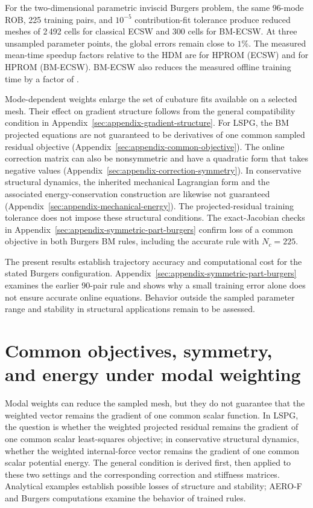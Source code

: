 \documentclass[a4paper,12pt]{article}
\begin{document}
For the two-dimensional parametric inviscid Burgers problem, the same 96-mode ROB, 225 training pairs, and $10^{-5}$ contribution-fit tolerance produce reduced meshes of 2\,492 cells for classical ECSW and 300 cells for BM-ECSW. At three unsampled parameter points, the global errors remain close to $1\%$. The measured mean-time speedup factors relative to the HDM are \ECSWFOMSpeedup{} for HPROM (ECSW) and \BMFOMSpeedup{} for HPROM (BM-ECSW). BM-ECSW also reduces the measured offline training time by a factor of \OfflineTrainingRatio{}.

Mode-dependent weights enlarge the set of cubature fits available on a selected mesh. Their effect on gradient structure follows from the general compatibility condition in Appendix~\ref{sec:appendix-gradient-structure}. For LSPG, the BM projected equations are not guaranteed to be derivatives of one common sampled residual objective (Appendix~\ref{sec:appendix-common-objective}). The online correction matrix can also be nonsymmetric and have a quadratic form that takes negative values (Appendix~\ref{sec:appendix-correction-symmetry}). In conservative structural dynamics, the inherited mechanical Lagrangian form and the associated energy-conservation construction are likewise not guaranteed (Appendix~\ref{sec:appendix-mechanical-energy}). The projected-residual training tolerance does not impose these structural conditions. The exact-Jacobian checks in Appendix~\ref{sec:appendix-symmetric-part-burgers} confirm loss of a common objective in both Burgers BM rules, including the accurate rule with $N_c=225$.

The present results establish trajectory accuracy and computational cost for the stated Burgers configuration. Appendix~\ref{sec:appendix-symmetric-part-burgers} examines the earlier 90-pair rule and shows why a small training error alone does not ensure accurate online equations. Behavior outside the sampled parameter range and stability in structural applications remain to be assessed.

\appendix
\clearpage
\section{Common objectives, symmetry, and energy under modal weighting}
\label{sec:modal-structure}

Modal weights can reduce the sampled mesh, but they do not guarantee that the weighted vector remains the gradient of one common scalar function. In LSPG, the question is whether the weighted projected residual remains the gradient of one common scalar least-squares objective; in conservative structural dynamics, whether the weighted internal-force vector remains the gradient of one common scalar potential energy. The general condition is derived first, then applied to these two settings and the corresponding correction and stiffness matrices. Analytical examples establish possible losses of structure and stability; AERO-F and Burgers computations examine the behavior of trained rules.
\end{document}
